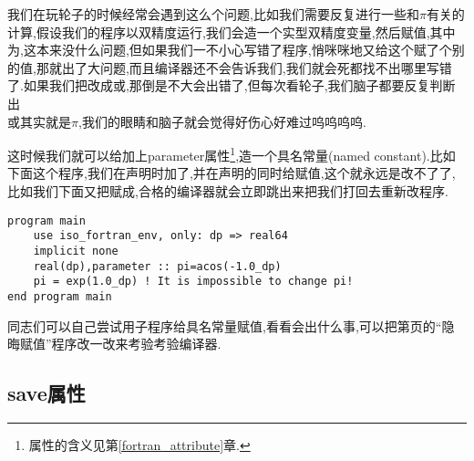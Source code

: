 我们在玩轮子的时候经常会遇到这么个问题,比如我们需要反复进行一些和$\pi$有关的计算,假设我们的程序以双精度运行,我们会造一个实型双精度变量,然后赋值,其中为,这本来没什么问题,但如果我们一不小心写错了程序,悄咪咪地又给这个赋了个别的值,那就出了大问题,而且编译器还不会告诉我们,我们就会死都找不出哪里写错了.如果我们把改成或,那倒是不大会出错了,但每次看轮子,我们脑子都要反复判断出\\或其实就是$\pi$,我们的眼睛和脑子就会觉得好伤心好难过呜呜呜呜.

这时候我们就可以给加上parameter属性\footnote{属性的含义见第\ref{fortran_attribute}章.},造一个具名常量(named constant).比如下面这个程序,我们在声明时加了,并在声明的同时给赋值,这个就永远是改不了了,比如我们下面又把赋成,合格的编译器就会立即跳出来把我们打回去重新改程序.
\begin{lstlisting}
program main
    use iso_fortran_env, only: dp => real64
    implicit none
    real(dp),parameter :: pi=acos(-1.0_dp)
    pi = exp(1.0_dp) ! It is impossible to change pi!
end program main
\end{lstlisting}
同志们可以自己尝试用子程序给具名常量赋值,看看会出什么事,可以把第\pageref{secret_assignment}页的``隐晦赋值''程序改一改来考验考验编译器.

\subsection{save属性}

